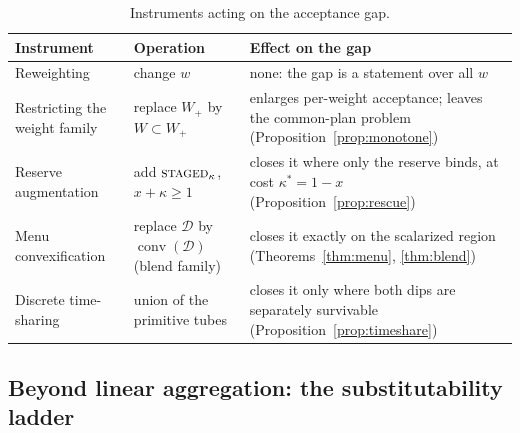 \documentclass[preprint,11pt,authoryear]{elsarticle}
\theoremstyle{definition}
\theoremstyle{remark}
\newcommand{\Wp}{W_+}
\newcommand{\conv}{\operatorname{conv}}
\newcommand{\act}[1]{\textsc{#1}}
\begin{document}
\begin{table}[!htbp]
\centering\small
\caption{Instruments acting on the acceptance gap.}
\label{tab:instruments}
\begin{tabularx}{\textwidth}{@{}>{\raggedright\arraybackslash}p{}>{\raggedright\arraybackslash}p{}X@{}}
\toprule
Instrument & Operation & Effect on the gap \\
\midrule
Reweighting & change $w$ & none: the gap is a statement over all $w$ \\
Restricting the weight family & replace $\Wp$ by $W\subset\Wp$ & enlarges per-weight acceptance; leaves the common-plan problem (Proposition~\ref{prop:monotone}) \\
Reserve augmentation & add $\act{staged}_\kappa$, $x+\kappa\ge1$ & closes it where only the reserve binds, at cost $\kappa^*=1-x$ (Proposition~\ref{prop:rescue}) \\
Menu convexification & replace $\mathcal D$ by $\conv(\mathcal D)$ (blend family) & closes it exactly on the scalarized region (Theorems~\ref{thm:menu}, \ref{thm:blend}) \\
Discrete time-sharing & union of the primitive tubes & closes it only where both dips are separately survivable (Proposition~\ref{prop:timeshare}) \\
\bottomrule
\end{tabularx}
\end{table}

\subsection{Beyond linear aggregation: the substitutability ladder}\label{sec:ladder}
\end{document}
